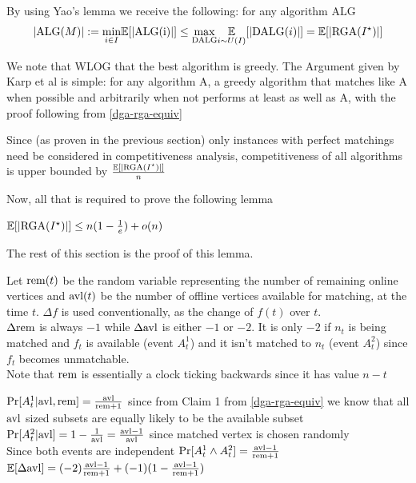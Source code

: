 By using Yao's lemma we receive the following: for any algorithm $\mathrm{ALG}$
\begin{equation}
	|\mathrm{ALG}(M)|:=\underset{i\in I}{\min}\mathbb{E}[|\mathrm{ALG(i)}|]\leq \underset{\mathrm{DALG}}{\max}\underset{i\sim U(I)}{\mathbb{E}}[|\mathrm{DALG}(i)|]=\mathbb{E}[|\mathrm{RGA}(I^\star)|]
\end{equation}

We note that WLOG that the best algorithm is greedy. The Argument given by Karp et al is simple: for any algorithm $\mathrm{A}$, a greedy algorithm that matches like $\mathrm{A}$ when possible and arbitrarily when not performs at least as well as $\mathrm{A}$, with the proof following from \autoref{dga-rga-equiv}

Since (as proven in the previous section) only instances with perfect matchings need be considered in competitiveness analysis, competitiveness of all algorithms is upper bounded by $\frac{\mathbb{E}[|\mathrm{RGA}(I^\star)|]}{n}$

Now, all that is required to prove the following lemma 

\begin{lemma}
	\label{rga-performance}
	$\mathbb{E}[|\mathrm{RGA}(I^\star)|]\leq n(1-\frac{1}{e})+o(n)$
\end{lemma}
The rest of this section is the proof of this lemma.


Let $\mathrm{rem}(t)$ be the random variable representing the number of remaining online vertices and $\mathrm{avl}(t)$ be the number of offline vertices available for matching, at the time $t$. $\Delta f$ is used conventionally, as the change of $f(t)$ over $t$.\\
$\Delta \mathrm{rem}$ is always $-1$ while $\Delta\mathrm{avl}$ is either $-1$ or $-2$. It is only $-2$ if $n_t$ is being matched and $f_t$ is available (event $A_t^1$) and it isn't matched to $n_t$ (event $A_t^2$) since $f_t$ becomes unmatchable.\\
Note that $\mathrm{rem}$ is essentially a clock ticking backwards since it has value $n-t$

$\Pr[A^1_t|\mathrm{avl},\mathrm{rem}]=\frac{\mathrm{avl}}{\mathrm{rem}+1}$ since from Claim 1 from \autoref{dga-rga-equiv} we know that all $\mathrm{avl}$ sized subsets are equally likely to be the available subset\\
$\Pr[A^2_t|\mathrm{avl}]=1-\frac{1}{\mathrm{avl}}=\frac{\mathrm{avl}-1}{\mathrm{avl}}$ since matched vertex is chosen randomly\\
Since both events are independent $\Pr[A^1_t\land A^2_t]=\frac{\mathrm{avl}-1}{\mathrm{rem}+1}$\\
$\mathbb{E}[\Delta\mathrm{avl}]=(-2)\frac{\mathrm{avl}-1}{\mathrm{rem}+1}+(-1)(1-\frac{\mathrm{avl}-1}{\mathrm{rem}+1})$

